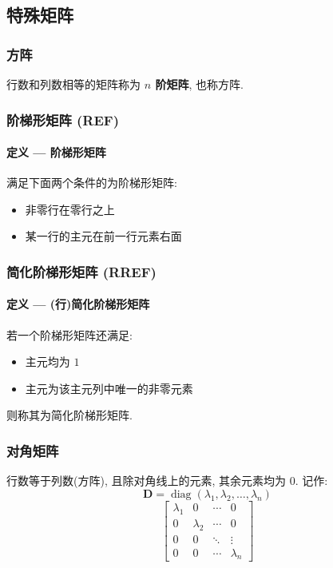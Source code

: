 \documentclass[UTF8]{ctexart}
\newcommand{\ve}[1]{\boldsymbol{\mathbf{#1}}}
\newcommand{\diag}{\operatorname{diag}}
\begin{document}
\subsection{特殊矩阵}
\subsubsection*{方阵}
行数和列数相等的矩阵称为 {\bf $ n $ 阶矩阵}, 也称方阵.

\subsubsection*{阶梯形矩阵 (REF)}
\begin{framed}
    \vspace{-0.7em}
    \paragraph{定义 --- 阶梯形矩阵}
    满足下面两个条件的为阶梯形矩阵:
    \begin{itemize}
        \item 非零行在零行之上
        \item 某一行的主元在前一行元素右面
    \end{itemize}
\end{framed}

\subsubsection*{简化阶梯形矩阵 (RREF)}
\begin{framed}
    \vspace{-0.7em}
    \paragraph{定义 --- (行)简化阶梯形矩阵}
    若一个阶梯形矩阵还满足:
    \begin{itemize}
        \item 主元均为 $ 1 $
        \item 主元为该主元列中唯一的非零元素
    \end{itemize}
    则称其为简化阶梯形矩阵.
\end{framed}

\subsubsection*{对角矩阵}
行数等于列数(方阵), 且除对角线上的元素, 其余元素均为 $ 0 $. 记作: 
\[ \ve D = \diag(\lambda_1, \lambda_2, \dots, \lambda_n) \]
\[ \begin{bmatrix}
    \lambda_1   & 0           & \cdots & 0        \\
    0             & \lambda_2 & \cdots & 0        \\
    0             & 0           & \ddots & \vdots   \\
    0             & 0           & \cdots & \lambda_n 
\end{bmatrix} \]
\end{document}
